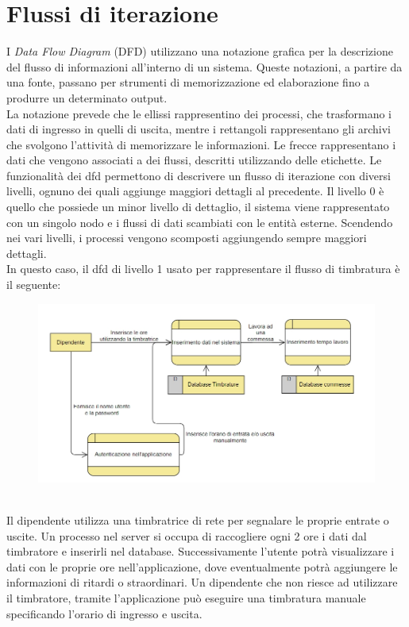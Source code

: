 \documentclass[12pt]{report}
\begin{document}
\section{Flussi di iterazione}
I \textit{Data Flow Diagram}\cite{dfd} (DFD) utilizzano una notazione grafica per la descrizione del flusso di informazioni all'interno di un sistema. Queste notazioni, a partire da una fonte, passano per strumenti di memorizzazione ed elaborazione fino a produrre un determinato output.\\ La notazione prevede che le ellissi rappresentino dei processi, che trasformano i dati di ingresso in quelli di uscita, mentre i rettangoli rappresentano gli archivi che svolgono l'attività di memorizzare le informazioni. Le frecce rappresentano i dati che vengono associati a dei flussi, descritti utilizzando delle etichette.
Le funzionalità dei dfd permettono di descrivere un flusso di iterazione con diversi livelli, ognuno dei quali aggiunge maggiori dettagli al precedente. Il livello 0 è quello che possiede un minor livello di dettaglio, il sistema viene rappresentato con un singolo nodo e i flussi di dati scambiati con le entità esterne. Scendendo nei vari livelli, i processi vengono scomposti aggiungendo sempre maggiori dettagli. \\
In questo caso, il dfd di livello 1 usato per rappresentare il flusso di timbratura è il seguente:
\begin{figure}[!h]
	\centering
	\includegraphics[width=1\linewidth]{immagini/dfd}
	\caption{}
	\label{fig:dfd}
\end{figure}
\\
Il dipendente utilizza una timbratrice di rete per segnalare le proprie entrate o uscite. Un processo nel server si occupa di raccogliere ogni 2 ore i dati dal timbratore e inserirli nel database. Successivamente l'utente potrà visualizzare i dati con le proprie ore nell'applicazione, dove eventualmente potrà aggiungere le informazioni di ritardi o straordinari. Un dipendente che non riesce ad utilizzare il timbratore, tramite l'applicazione può eseguire una timbratura manuale specificando l'orario di ingresso e uscita.
\end{document}
